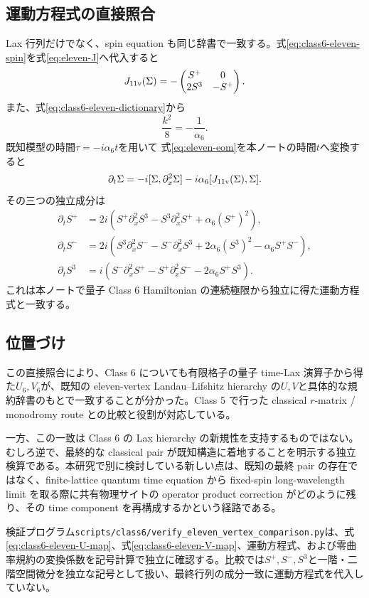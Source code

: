 \subsection{運動方程式の直接照合}

Lax 行列だけでなく、spin equation も同じ辞書で一致する。式\eqref{eq:class6-eleven-spin}を式\eqref{eq:eleven-J}へ代入すると
\begin{equation}
J_{\rm 11v}(\Sigma)
=-\begin{pmatrix}
S^+&0\\
2S^3&-S^+
\end{pmatrix}.
\end{equation}
また、式\eqref{eq:class6-eleven-dictionary}から
\begin{equation}
\frac{k^2}{8}=-\frac1{\alpha_6}.
\end{equation}
既知模型の時間$\tau=-i\alpha_6 t$を用いて
式\eqref{eq:eleven-eom}を本ノートの時間$t$へ変換すると
\begin{equation}
\partial_t\Sigma
=-i[\Sigma,\partial_x^2\Sigma]
-i\alpha_6[J_{\rm 11v}(\Sigma),\Sigma].
\label{eq:class6-eleven-matrix-eom}
\end{equation}
その三つの独立成分は
\begin{align}
\partial_t S^+
&=2i\left(
S^+\partial_x^2S^3-S^3\partial_x^2S^+
+\alpha_6(S^+)^2
\right),\\
\partial_t S^-
&=2i\left(
S^3\partial_x^2S^--S^-\partial_x^2S^3
+2\alpha_6(S^3)^2-\alpha_6S^+S^-
\right),\\
\partial_t S^3
&=i\left(
S^-\partial_x^2S^+-S^+\partial_x^2S^-
-2\alpha_6S^+S^3
\right).
\end{align}
これは本ノートで量子 Class 6 Hamiltonian の連続極限から独立に得た運動方程式と一致する。

\subsection{位置づけ}

この直接照合により、Class 6 についても有限格子の量子 time-Lax 演算子から得た$U_6,V_6$が、既知の eleven-vertex Landau--Lifshitz hierarchy の$U,V$と具体的な規約辞書のもとで一致することが分かった。Class 5 で行った classical $r$-matrix / monodromy route との比較と役割が対応している。

一方、この一致は Class 6 の Lax hierarchy の新規性を支持するものではない。むしろ逆で、最終的な classical pair が既知構造に着地することを明示する独立検算である。本研究で別に検討している新しい点は、既知の最終 pair の存在ではなく、finite-lattice quantum time equation から fixed-spin long-wavelength limit を取る際に共有物理サイトの operator product correction がどのように残り、その time component を再構成するかという経路である。

検証プログラム\texttt{scripts/class6/verify\_eleven\_vertex\_comparison.py}は、式\eqref{eq:class6-eleven-U-map}、式\eqref{eq:class6-eleven-V-map}、運動方程式、および零曲率規約の変換係数を記号計算で独立に確認する。比較では$S^+,S^-,S^3$と一階・二階空間微分を独立な記号として扱い、最終行列の成分一致に運動方程式を代入していない。

